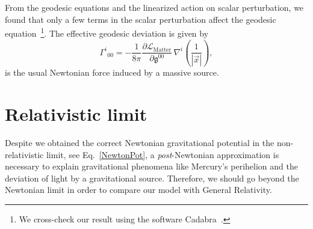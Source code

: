 \documentclass[aps,prd,12pt,twocolumn,superscriptaddress,showpacs,showkeys,reprint%
]{revtex4-1}
\renewcommand{\(}{\left(}
\renewcommand{\)}{\right)}
\renewcommand{\[}{\left[}
\renewcommand{\]}{\right]}
\begin{document}
From the geodesic equations and the linearized action on scalar perturbation, we found that only a few terms in the scalar perturbation affect the geodesic equation~\footnote{We cross-check our result using the software Cadabra~\cite{Peeters2007550,peeters2007symbolic,Peeters:2007wn}.}. The effective geodesic deviation is given by
\begin{equation}
  \label{NewtonPot}
  \Gamma^i{}_{00} = - \frac{1}{8\pi} \frac{ \partial\mathcal{L}_{\text{Matter}} }{ \partial \mathfrak{g}^{00} } \, \nabla^i \left(\frac{1}{|\vec{x}|}\right),
\end{equation}
is the usual Newtonian force induced by a massive source.


\section{\label{rlimit}Relativistic limit}
Despite we obtained the correct Newtonian gravitational potential in the non-relativistic limit, see Eq.~\eqref{NewtonPot}, a \emph{post}-Newtonian approximation is necessary to explain gravitational phenomena like Mercury's perihelion and the deviation of light by a gravitational source. Therefore, we should go beyond the Newtonian limit in order to compare our model with General Relativity.
\end{document}

